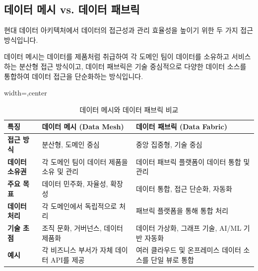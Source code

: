 \documentclass[11pt,a4paper]{article}
\begin{document}
\subsection{데이터 메시 vs. 데이터 패브릭}
현대 데이터 아키텍처에서 데이터의 접근성과 관리 효율성을 높이기 위한 두 가지 접근 방식입니다.

\begin{tcolorbox}[mybox={핵심 요약: 데이터 접근성 향상}]
데이터 메시는 데이터를 제품처럼 취급하여 각 도메인 팀이 데이터를 소유하고 서비스하는 분산형 접근 방식이고, 데이터 패브릭은 기술 중심적으로 다양한 데이터 소스를 통합하여 데이터 접근을 단순화하는 방식입니다.
\end{tcolorbox}

\begin{table}[h!]
\centering
\caption{데이터 메시와 데이터 패브릭 비교}
\label{tab:data_mesh_fabric_comparison}
\begin{adjustbox}{width=\textwidth,center}
\begin{tabular}{p{}p{}p{}}
\toprule
\textbf{특징} & \textbf{데이터 메시 (Data Mesh)} & \textbf{데이터 패브릭 (Data Fabric)} \\
\midrule
\textbf{접근 방식} & 분산형, 도메인 중심 & 중앙 집중형, 기술 중심 \\
\textbf{데이터 소유권} & 각 도메인 팀이 데이터 제품을 소유 및 관리 & 데이터 패브릭 플랫폼이 데이터 통합 및 관리 \\
\textbf{주요 목표} & 데이터 민주화, 자율성, 확장성 & 데이터 통합, 접근 단순화, 자동화 \\
\textbf{데이터 처리} & 각 도메인에서 독립적으로 처리 & 패브릭 플랫폼을 통해 통합 처리 \\
\textbf{기술 초점} & 조직 문화, 거버넌스, 데이터 제품화 & 데이터 가상화, 그래프 기술, AI/ML 기반 자동화 \\
\textbf{예시} & 각 비즈니스 부서가 자체 데이터 API를 제공 & 여러 클라우드 및 온프레미스 데이터 소스를 단일 뷰로 통합 \\
\bottomrule
\end{tabular}
\end{adjustbox}
\end{table}
\end{document}
